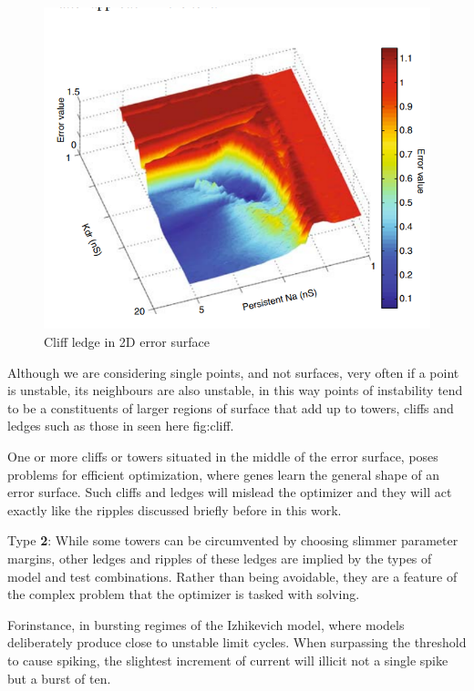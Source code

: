 \begin{figure}
    \centering
    \includegraphics{figures/cliff}
    \caption{Cliff ledge in 2D error surface}
    \label{fig:cliff}
\end{figure}


Although we are considering single points, and not surfaces, very often if a point is unstable, its neighbours are also unstable, in this way points of instability tend to be a constituents of larger regions of surface that add up to towers, cliffs and ledges such as those in seen here {fig:cliff}.

One or more cliffs or towers situated in the middle of the error surface, poses problems for efficient optimization, where genes learn the general shape of an error surface. Such cliffs and ledges will mislead the optimizer and they will act exactly like the ripples discussed briefly before in this work.

Type \textbf{2}: While some towers can be circumvented by choosing slimmer parameter margins, other ledges and ripples of these ledges are implied by the types of model and test combinations. Rather than being avoidable, they are a feature of the complex problem that the optimizer is tasked with solving.

Forinstance, in bursting regimes of the Izhikevich model, where models deliberately produce close to unstable limit cycles. When surpassing the threshold to cause spiking, the slightest increment of current  will illicit not a single spike but a burst of ten.

